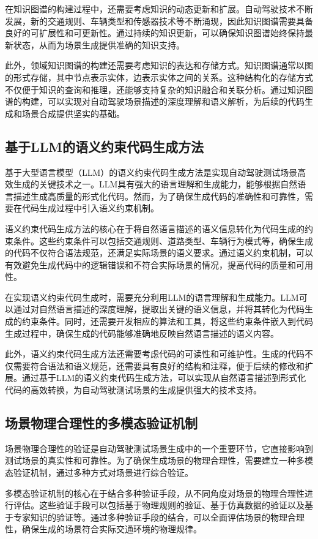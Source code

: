 	在知识图谱的构建过程中，还需要考虑知识的动态更新和扩展。自动驾驶技术不断发展，新的交通规则、车辆类型和传感器技术等不断涌现，因此知识图谱需要具备良好的可扩展性和可更新性。通过持续的知识更新，可以确保知识图谱始终保持最新状态，从而为场景生成提供准确的知识支持。
	
	此外，领域知识图谱的构建还需要考虑知识的表达和存储方式。知识图谱通常以图的形式存储，其中节点表示实体，边表示实体之间的关系。这种结构化的存储方式不仅便于知识的查询和推理，还能够支持复杂的知识融合和关联分析。通过知识图谱的构建，可以实现对自动驾驶场景描述的深度理解和语义解析，为后续的代码生成和场景合成提供坚实的基础。
	
	\subsection{基于LLM的语义约束代码生成方法}
	基于大型语言模型（LLM）的语义约束代码生成方法是实现自动驾驶测试场景高效生成的关键技术之一。LLM具有强大的语言理解和生成能力，能够根据自然语言描述生成高质量的形式化代码。然而，为了确保生成代码的准确性和可靠性，需要在代码生成过程中引入语义约束机制。
	
	语义约束代码生成方法的核心在于将自然语言描述的语义信息转化为代码生成的约束条件。这些约束条件可以包括交通规则、道路类型、车辆行为模式等，确保生成的代码不仅符合语法规范，还满足实际场景的语义要求。通过语义约束机制，可以有效避免生成代码中的逻辑错误和不符合实际场景的情况，提高代码的质量和可用性。
	
	在实现语义约束代码生成时，需要充分利用LLM的语言理解和生成能力。LLM可以通过对自然语言描述的深度理解，提取出关键的语义信息，并将其转化为代码生成的约束条件。同时，还需要开发相应的算法和工具，将这些约束条件嵌入到代码生成过程中，确保生成的代码能够准确地反映自然语言描述的语义内容。
	
	此外，语义约束代码生成方法还需要考虑代码的可读性和可维护性。生成的代码不仅需要符合语法和语义规范，还需要具有良好的结构和注释，便于后续的修改和扩展。通过基于LLM的语义约束代码生成方法，可以实现从自然语言描述到形式化代码的高效转换，为自动驾驶测试场景的生成提供强大的技术支持。
	
	\subsection{场景物理合理性的多模态验证机制}
	场景物理合理性的验证是自动驾驶测试场景生成中的一个重要环节，它直接影响到测试场景的真实性和可靠性。为了确保生成场景的物理合理性，需要建立一种多模态验证机制，通过多种方式对场景进行综合验证。
	
	多模态验证机制的核心在于结合多种验证手段，从不同角度对场景的物理合理性进行评估。这些验证手段可以包括基于物理规则的验证、基于仿真数据的验证以及基于专家知识的验证等。通过多种验证手段的结合，可以全面评估场景的物理合理性，确保生成的场景符合实际交通环境的物理规律。
	

